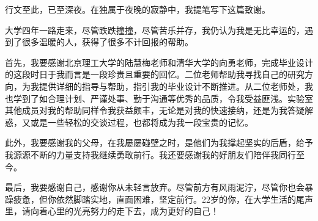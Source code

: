 %
%
%
%
%
%

\begin{acknowledgements}
  行文至此，已至深夜。在独属于夜晚的寂静中，我提笔写下这篇致谢。
  
  大学四年一路走来，尽管跌跌撞撞，尽管苦乐并存，我仍认为我是无比幸运的，遇到了很多温暖的人，获得了很多不计回报的帮助。
  
  首先，我要感谢北京理工大学的陆慧梅老师和清华大学的向勇老师，完成毕业设计的这段时日于我而言是一段珍贵且重要的回忆。二位老师帮助我寻找自己的研究方向，为我提供详细的指导与帮助，指引我的毕业设计不断推进。从二位老师处，我也学到了如合理计划、严谨处事、勤于沟通等优秀的品质，令我受益匪浅。实验室其他成员对我的帮助同样令我获益颇丰，无论是对我的快速接纳，还是为我答疑解惑，又或是一些轻松的交谈过程，也都将成为我一段宝贵的记忆。

  此外，我要感谢我的父母，在我屡屡碰壁之时，是他们为我撑起坚实的后盾，给予我源源不断的力量支持我继续勇敢前行。我还要感谢我的好朋友们陪伴我同行至今。

  最后，我要感谢自己，感谢你从未轻言放弃。尽管前方有风雨泥泞，尽管你也会暴躁疲惫，但你依然脚踏实地，直面困难，坚定前行。22岁的你，在大学生活的尾声里，请向着心里的光亮努力的走下去，成为更好的自己！

\end{acknowledgements}
